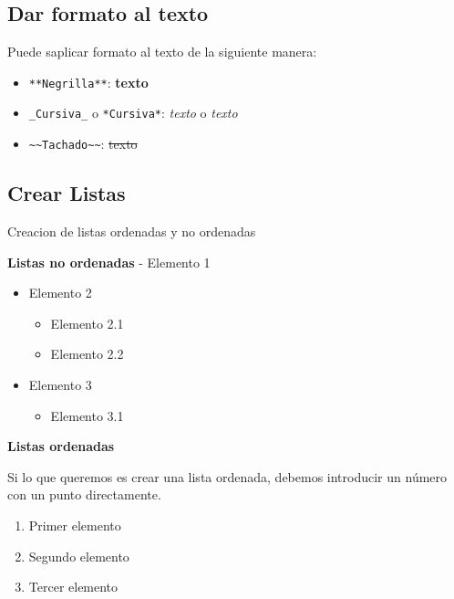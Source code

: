 \documentclass[
]{book}
\providecommand{\tightlist}{%
  \setlength{\itemsep}{0pt}\setlength{\parskip}{0pt}}
\theoremstyle{definition}
\theoremstyle{definition}
\theoremstyle{definition}
\theoremstyle{definition}
\theoremstyle{remark}
\begin{document}
\hypertarget{dar-formato-al-texto}{%
\subsection*{Dar formato al texto}\label{dar-formato-al-texto}}

Puede saplicar formato al texto de la siguiente manera:

\begin{itemize}
\tightlist
\item
  \texttt{**Negrilla**}: \textbf{texto}
\item
  \texttt{\_Cursiva\_} o \texttt{*Cursiva*}: \emph{texto} o \emph{texto}
\item
  \texttt{\textasciitilde{}\textasciitilde{}Tachado\textasciitilde{}\textasciitilde{}}: \st{texto}
\end{itemize}

\hypertarget{crear-listas}{%
\subsection*{Crear Listas}\label{crear-listas}}

Creacion de listas ordenadas y no ordenadas

\textbf{Listas no ordenadas}
- Elemento 1

\begin{itemize}
\item
  Elemento 2

  \begin{itemize}
  \item
    Elemento 2.1
  \item
    Elemento 2.2
  \end{itemize}
\item
  Elemento 3

  \begin{itemize}
  \tightlist
  \item
    Elemento 3.1
  \end{itemize}
\end{itemize}

\textbf{Listas ordenadas}

Si lo que queremos es crear una lista ordenada, debemos introducir un número con un punto directamente.

\begin{enumerate}
\def\labelenumi{\arabic{enumi}.}
\tightlist
\item
  Primer elemento
\item
  Segundo elemento
\item
  Tercer elemento
\end{enumerate}
\end{document}
